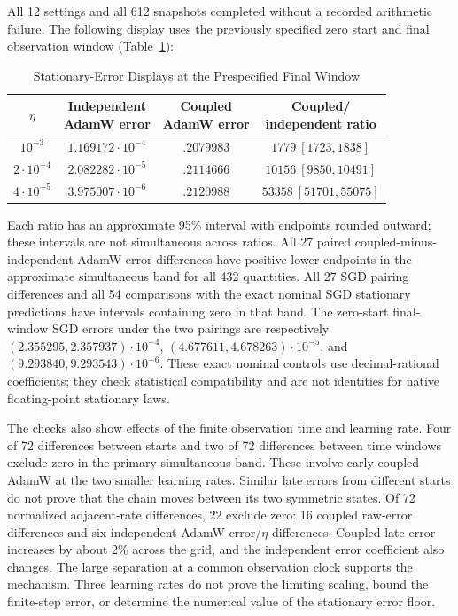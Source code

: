 All 12 settings and all 612 snapshots completed without a recorded arithmetic
failure. The following display uses the previously specified zero start
and final observation window (Table~\ref{tab:matrix-errors}):
\begin{table}[htbp]
\caption{Stationary-Error Displays at the Prespecified Final Window}\label{tab:matrix-errors}
\centering

\small
\begin{tabular}{cccc}
\toprule
$\eta$ & \shortstack{Independent\\AdamW error} & \shortstack{Coupled\\AdamW error} & \shortstack{Coupled/\\independent ratio}\\
\midrule
$10^{-3}$ & $1.169172\cdot10^{-4}$ & $.2079983$ & $1779\ [1723,1838]$\\
$2\cdot10^{-4}$ & $2.082282\cdot10^{-5}$ & $.2114666$ & $10156\ [9850,10491]$\\
$4\cdot10^{-5}$ & $3.975007\cdot10^{-6}$ & $.2120988$ & $53358\ [51701,55075]$\\
\bottomrule
\end{tabular}
\end{table}
Each ratio has an approximate 95\% interval with endpoints rounded outward;
these intervals are not simultaneous across ratios.
All 27 paired coupled-minus-independent AdamW error differences have positive
lower endpoints in the approximate simultaneous band for all 432 quantities.
All 27 SGD pairing differences and all 54 comparisons with the exact nominal
SGD stationary predictions have intervals containing zero in that band.
The zero-start final-window SGD errors
under the two pairings are respectively
$(2.355295,2.357937)\cdot10^{-4}$,
$(4.677611,4.678263)\cdot10^{-5}$, and
$(9.293840,9.293543)\cdot10^{-6}$.
These exact nominal controls use decimal-rational coefficients; they check
statistical compatibility and are not identities for native floating-point
stationary laws.

The checks also show effects of the finite observation time and learning
rate. Four of 72 differences between starts and two of 72 differences
between time windows exclude zero in the primary simultaneous band. These
involve early coupled AdamW at the two smaller learning rates. Similar late
errors from different starts do not prove that the chain moves between its
two symmetric states. Of 72 normalized adjacent-rate differences, 22 exclude
zero: 16 coupled raw-error differences and six independent AdamW
error/$\eta$ differences. Coupled late error increases by about 2\% across
the grid, and the independent error coefficient also changes. The large
separation at a common observation clock supports the mechanism. Three
learning rates do not prove the limiting scaling, bound the finite-step
error, or determine the numerical value of the stationary error floor.

